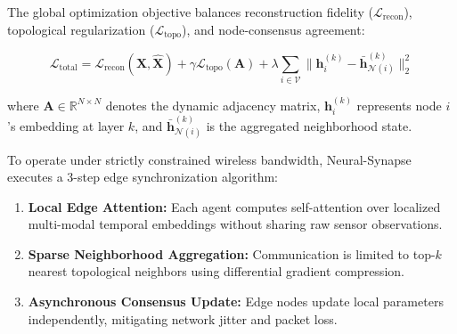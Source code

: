 \documentclass[portrait,a0b,posterscale=1.0]{a0poster}
\begin{document}
\begin{minipage}[t]{0.488\textwidth}
\begin{tcolorbox}[posterbox, title={\faCogs\ 2. System Architecture \& Pipeline}]
    {\large
    The global optimization objective balances reconstruction fidelity ($\mathcal{L}_{\text{recon}}$), topological regularization ($\mathcal{L}_{\text{topo}}$), and node-consensus agreement:
    }
    \vspace{2mm}

    \begin{equation*}
      \mathcal{L}_{\text{total}} = \mathcal{L}_{\text{recon}}(\mathbf{X}, \hat{\mathbf{X}}) + \gamma \mathcal{L}_{\text{topo}}(\mathbf{A}) + \lambda \sum_{i \in \mathcal{V}} \bigl\| \mathbf{h}_i^{(k)} - \bar{\mathbf{h}}_{\mathcal{N}(i)}^{(k)} \bigr\|_2^2
    \end{equation*}

    \vspace{2mm}
    {\large
    where $\mathbf{A} \in \mathbb{R}^{N \times N}$ denotes the dynamic adjacency matrix, $\mathbf{h}_i^{(k)}$ represents node $i$'s embedding at layer $k$, and $\bar{\mathbf{h}}_{\mathcal{N}(i)}^{(k)}$ is the aggregated neighborhood state.
    }
  \end{tcolorbox}

  \vspace{6mm}

  \begin{tcolorbox}[posterbox, title={\faLayerGroup\ 3. Decentralized Graph Learning Strategy}]
    {\large
    To operate under strictly constrained wireless bandwidth, Neural-Synapse executes a 3-step edge synchronization algorithm:
    }

    \vspace{3mm}

    \begin{enumerate}[leftmargin=8mm, label={\bfseries\color{NavyDark}\arabic*.}]
      \item {\bfseries Local Edge Attention:} Each agent computes self-attention over localized multi-modal temporal embeddings without sharing raw sensor observations.
      \item {\bfseries Sparse Neighborhood Aggregation:} Communication is limited to top-$k$ nearest topological neighbors using differential gradient compression.
      \item {\bfseries Asynchronous Consensus Update:} Edge nodes update local parameters independently, mitigating network jitter and packet loss.
    \end{enumerate}


\end{tcolorbox}
\end{minipage}
\end{document}
